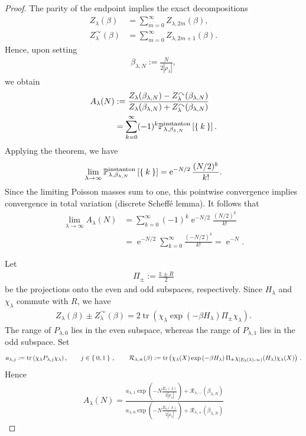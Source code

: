 \documentclass[10pt,a4paper]{amsart}
\newcommand{\Id}{\mathds{1}}
\newcommand{\abs}[1]{\left\lvert#1\right\rvert}
\newcommand{\br}[1]{\left(#1\right)}
\newcommand{\calR}{\mathcal{R}}
\newcommand{\ee}{\operatorname{e}}
\newcommand{\eq}[1]{\begin{align*}#1\end{align*}}
\newcommand{\tr}{\operatorname{tr}}
\begin{document}
\begin{proof}
The parity of the endpoint implies the exact decompositions
\eq{
Z_\lambda(\beta)
&=
\sum_{m=0}^{\infty}Z_{\lambda,2m}(\beta),\\
Z_\lambda^{\curvearrowright}(\beta)
&=
\sum_{m=0}^{\infty}Z_{\lambda,2m+1}(\beta).
}
Hence, upon setting
\eq{
\beta_{\lambda,N}:=\frac{N}{2\abs{\rho_\lambda}},
}
we obtain
\eq{
A_\lambda(N)
&:=
\frac{
Z_\lambda(\beta_{\lambda,N})
-
Z_\lambda^{\curvearrowright}(\beta_{\lambda,N})
}{
Z_\lambda(\beta_{\lambda,N})
+
Z_\lambda^{\curvearrowright}(\beta_{\lambda,N})
}\\
&=
\sum_{k=0}^{\infty}
(-1)^k
\mathbb{P}_{\lambda,\beta_{\lambda,N}}^{\mathrm{instanton}}
\left[\Set{k}\right].
}
Applying the theorem, we have
\eq{
\lim_{\lambda\to\infty}
\mathbb{P}_{\lambda,\beta_{\lambda,N}}^{\mathrm{instanton}}
\left[\Set{k}\right]
=
\ee^{-N/2}\frac{(N/2)^k}{k!}.
}
Since the limiting Poisson masses sum to one, this pointwise
convergence implies convergence in total variation (discrete Scheffé lemma). It follows that
\eq{
\lim_{\lambda\to\infty}A_\lambda(N)
&=
\sum_{k=0}^{\infty}
(-1)^k\ee^{-N/2}\frac{(N/2)^k}{k!}\\
&=
\ee^{-N/2}
\sum_{k=0}^{\infty}\frac{(-N/2)^k}{k!}
=
\ee^{-N}.
}

Let
\eq{
\Pi_\pm:=\frac{\Id\pm R}{2}
}
be the projections onto the even and odd subspaces, respectively.
Since $H_\lambda$ and $\chi_\lambda$ commute with $R$, we have
\eq{
Z_\lambda(\beta)\pm Z_\lambda^{\curvearrowright}(\beta)
=
2\tr\br{
\chi_\lambda
\exp\br{-\beta H_\lambda}
\Pi_\pm
\chi_\lambda
}.
}
The range of $P_{\lambda,0}$ lies in the even subspace, whereas the
range of $P_{\lambda,1}$ lies in the odd subspace. Set
\eq{
a_{\lambda,j}
:=
\tr\br{
\chi_\lambda P_{\lambda,j}\chi_\lambda
},
\qquad j\in\Set{0,1}\,,\,\qquad \calR_{\lambda,\pm}(\beta) := \tr\br{\chi_\lambda(X)\exp\br{-\beta H_\lambda}\Pi_\pm \chi_{[E_2(\lambda),\infty)}(H_\lambda) \chi_\lambda(X)}\,.
} %
Hence
\eq{
A_\lambda(N) = \frac{a_{\lambda,1}
\exp\br{
-N\frac{E_1(\lambda)}
        {2\abs{\rho_\lambda}}
}+\calR_{\lambda,-}(\beta_{\lambda,N})}{a_{\lambda,0}\exp\br{
-N\frac{E_0(\lambda)}
        {2\abs{\rho_\lambda}}
}+\calR_{\lambda,+}(\beta_{\lambda,N})}
}


\end{proof}
\end{document}
